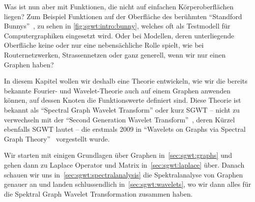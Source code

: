 Was ist nun aber mit Funktionen, die nicht auf einfachen K\"orperoberfl\"achen 
liegen? Zum Beispiel Funktionen auf der Oberfl\"ache des ber\"uhmten 
``Standford Bunnys''~\cite{noauthor_stanford_nodate}, zu sehen in 
\cref{fig:sgwt:intro:bunny}, welches oft als Testmodell f\"ur Computergraphiken 
eingesetzt wird. Oder bei Modellen, deren unterliegende Oberfl\"ache keine oder 
nur eine nebens\"achliche Rolle spielt, wie bei Routernetzwerken, 
Strassennetzen oder ganz generell, wenn wir nur einen Graphen haben?

In diesem Kapitel wollen wir deshalb eine Theorie entwickeln, wie 
wir die bereits bekannte Fourier- und Wavelet-Theorie auch auf einem Graphen 
anwenden 
k\"onnen, auf dessen Knoten die Funktionswerte definiert sind. Diese Theorie 
ist bekannt als ``Spectral Graph Wavelet Transform'' oder kurz SGWT -- nicht zu 
verwechseln mit der ``Second Generation Wavelet 
Transform''~\cite{noauthor_second-generation_2018}, deren K\"urzel ebenfalls 
SGWT lautet -- die erstmals 2009 in ``Wavelets on Graphs via Spectral Graph 
Theory''~\cite{hammond_wavelets_2009} vorgestellt wurde.

Wir starten mit einigen Grundlagen \"uber Graphen in~\cref{sec:sgwt:graphs} und 
gehen dann zu Laplace Operator und Matrix in~\cref{sec:sgwt:laplace} \"uber. 
Danach schauen wir uns in~\cref{sec:sgwt:spectralanalysis} die Spektralanalyse 
von Graphen genauer an und landen schlussendlich in~\cref{sec:sgwt:wavelets}, 
wo wir dann alles f\"ur die Spektral Graph Wavelet Transformation zusammen 
haben.
